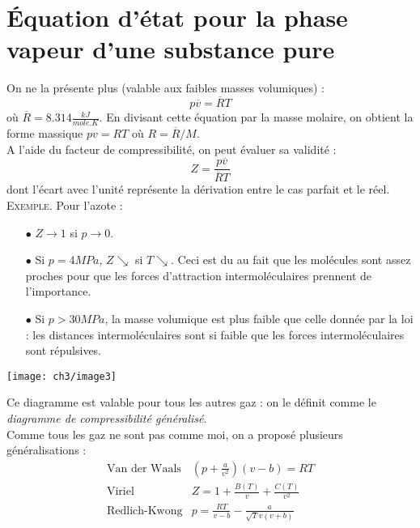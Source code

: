 \section{Équation d'état pour la phase vapeur d'une substance pure}
On ne la présente plus (valable aux faibles masses volumiques) :
\begin{equation}
p\overline{v} = \overline{R}T
\end{equation}
où $\overline{R} = 8.314 \frac{kJ}{mole.K}$. En divisant cette 
équation par la masse molaire, on obtient la forme massique $pv = 
RT$ où $R = \overline{R}/M$.\\
A l'aide du facteur de compressibilité, on peut évaluer sa 
validité :
\begin{equation}
Z = \frac{p\overline{v}}{\overline{R}T}
\end{equation}
dont l'écart avec l'unité représente la dérivation entre le cas 
parfait et le réel.\\

\textsc{Exemple}. Pour l'azote :
\begin{itemize}
\item[$\bullet$] $Z \rightarrow 1$ si $p \rightarrow 0$.
\item[$\bullet$] Si $p = 4MPa$, $Z \searrow$ si $T \searrow$. Ceci 
est du au fait que les molécules sont assez proches pour que les 
forces d'attraction intermoléculaires prennent de l'importance.
\item[$\bullet$] Si $p > 30MPa$, la masse volumique est plus faible 
que celle donnée par la loi : les distances intermoléculaires sont 
si faible que les forces intermoléculaires sont répulsives.
\end{itemize}
\begin{center}
\texttt{[image: ch3/image3]}
\end{center}
Ce diagramme est valable pour tous les autres gaz : on le définit 
comme le \textit{diagramme de compressibilité généralisé}.\\

Comme tous les gaz ne sont pas comme moi, on a proposé plusieurs 
généralisations :
\begin{equation}
\begin{array}{ll}
\text{Van der Waals} & \left(p+\frac{a}{v^2}\right)(v-b) = RT \\
\text{Viriel} & Z = 1+\frac{B(T)}{v} + \frac{C(T)}{v^2} \\
\text{Redlich-Kwong} & p = \frac{RT}{v-b}-\frac{a}{\sqrt{T}v(v+b)}
\end{array}
\end{equation}


